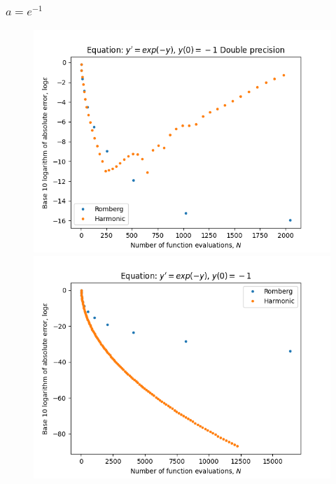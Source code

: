 \subsubsection{\(a = e^{-1}\)}
\begin{figure}[H]
\centering
\begin{minipage}{0.45\textwidth}
\centering
\includegraphics[scale=0.45]{../results/emr_plots/ln_em1.png}
\end{minipage}
\begin{minipage}{0.45\textwidth}
\centering
\includegraphics[scale=0.45]{../results/emr_plots/ln_em1_hp.png}
\end{minipage}
\end{figure}

